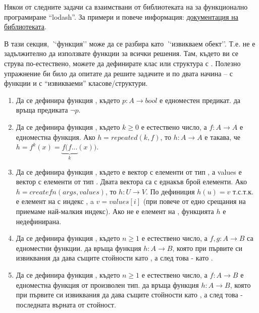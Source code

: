 \begin{mdframed}[hidealllines=true,backgroundcolor=gray!20]
  Някои от следните задачи са взаимствани от библиотеката на  за функционално програмиране ``lodash''. За примери и повече информация: \href{https://lodash.com/docs/4.17.15#after}{документация на библиотеката}.
\end{mdframed}

\begin{mdframed}[hidealllines=true,backgroundcolor=gray!20]
  В тази секция, \emph``функция'' може да се разбира като \emph``извикваем обект''. Т.е. не е задължително да използвате  функции за всички решения. Там, където ви се струва по-естествено, можете да дефинирате клас или структура с . Полезно упражнение би било да опитате да решите задачите и по двата начина --  с  функции и с ``извикваеми'' класове/структури.
\end{mdframed}


\begin{enumerate}[resume]

  \item Да се дефинира функция , където $p:A \rightarrow bool$ е едноместен предикат.  да връща предиката $\neg p$.


  \item Да се дефинира функция , където $k \geq 0$ е естествено число, а $f:A \rightarrow A$ е едноместна функция. Ако $h=repeated(k,f)$, то $h:A \rightarrow A$ е такава, че $h=f^k(x)=\underbrace{f(f...}_{k}(x))$.

  \item Да се дефинира функция , където  е вектор с елементи от тип , а values е вектор с елементи от тип . Двата вектора са с еднакъв брой елементи. Ако $h=createfn(args,values)$, то $h:U \rightarrow V$. По дефиниция $h(u)=v$ т.с.т.к.  е елемент на  с индекс , a $v=values[i]$ (при повече от едно срещания на  приемаме най-малкия индекс). Ако  не е елемент на , функцията $h$ е недефинирана.

  \item Да се дефинира функция , където $n \geq 1$ е естествено число, а $f,g:A \rightarrow B$ са едноместни функции.  да връща функция $h:A \rightarrow B$, която при първите си  извиквания да дава същите стойности като , а след това - като .


  \item Да се дефинира функция , където $n \geq 1$ е естествено число, а $f:A \rightarrow B$ е едноместна функция от произволен тип.  да връща функция $h:A \rightarrow B$, която при първите си  извиквания да дава същите стойности като , а след това - последната върната от  стойност.
  
\end{enumerate}
  

